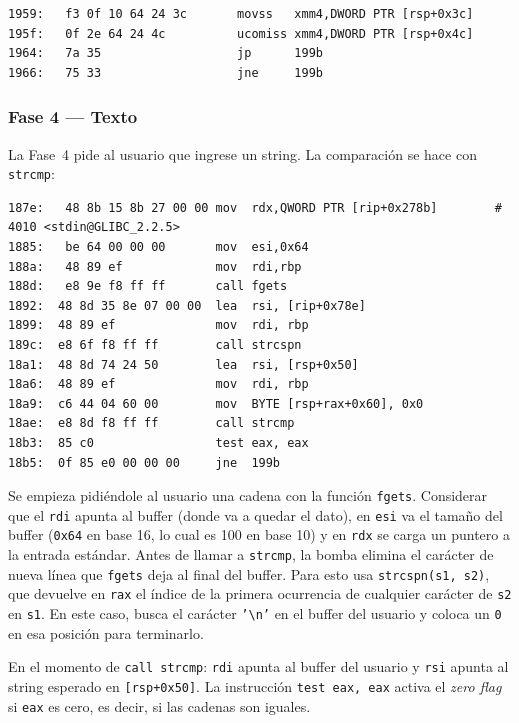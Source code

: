 \documentclass[10pt,a4paper]{article}
\begin{document}
\begin{lstlisting}[style=asmstyle, caption={Comparacion de float --- Fase 6 (offset 0x195f)}]
1959:	f3 0f 10 64 24 3c    	movss   xmm4,DWORD PTR [rsp+0x3c]
195f:	0f 2e 64 24 4c       	ucomiss xmm4,DWORD PTR [rsp+0x4c]
1964:	7a 35                	jp      199b
1966:	75 33                	jne     199b
\end{lstlisting}
\subsubsection*{Fase 4 — Texto}

La Fase~4 pide al usuario que ingrese un string. La comparación se hace con \texttt{strcmp}:
\begin{lstlisting}[style=asmstyle, caption={Ingreso del usurio, eliminacion del newline y comparacion de string --- Fase 4}]
187e:	48 8b 15 8b 27 00 00 mov  rdx,QWORD PTR [rip+0x278b]        # 4010 <stdin@GLIBC_2.2.5>
1885:	be 64 00 00 00       mov  esi,0x64
188a:	48 89 ef             mov  rdi,rbp
188d:	e8 9e f8 ff ff       call fgets
1892:  48 8d 35 8e 07 00 00  lea  rsi, [rip+0x78e]
1899:  48 89 ef              mov  rdi, rbp
189c:  e8 6f f8 ff ff        call strcspn
18a1:  48 8d 74 24 50        lea  rsi, [rsp+0x50]
18a6:  48 89 ef              mov  rdi, rbp
18a9:  c6 44 04 60 00        mov  BYTE [rsp+rax+0x60], 0x0
18ae:  e8 8d f8 ff ff        call strcmp
18b3:  85 c0                 test eax, eax
18b5:  0f 85 e0 00 00 00     jne  199b
\end{lstlisting}
Se empieza pidiéndole al usuario una cadena con la función \texttt{fgets}. Considerar que el \texttt{rdi} apunta al buffer (donde va a quedar el dato), en \texttt{esi} va el tamaño del buffer (\texttt{0x64} en base 16, lo cual es 100 en base 10) y en \texttt{rdx} se carga un puntero a la entrada estándar. Antes de llamar a \texttt{strcmp}, la bomba elimina el carácter de nueva línea que \texttt{fgets} deja al final del buffer. Para esto usa \texttt{strcspn(s1, s2)}, que devuelve en \texttt{rax} el índice de la primera ocurrencia de cualquier carácter de \texttt{s2} en \texttt{s1}. En este caso, busca el carácter \texttt{'\textbackslash n'} en el buffer del usuario y coloca un \texttt{0} en esa posición para terminarlo.

En el momento de \texttt{call strcmp}: \texttt{rdi} apunta al buffer del usuario y \texttt{rsi} apunta al string esperado en \texttt{[rsp+0x50]}. La instrucción \texttt{test eax, eax} activa el \textit{zero flag} si \texttt{eax} es cero, es decir, si las cadenas son iguales.
\end{document}
